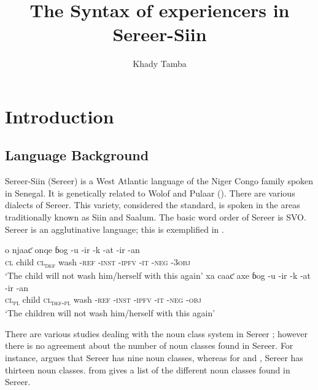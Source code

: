\documentclass[output=paper]{langscibook}
\author{Khady Tamba\affiliation{Université Cheikh Anta Diop}}
\title{The Syntax of experiencers in Sereer-Siin}
\begin{document}
 
\maketitle 

 

\section{Introduction}
\subsection{Language Background}

Sereer-Siin (Sereer) is a West Atlantic language of the Niger Congo family spoken in Senegal. It is genetically  related to Wolof  and Pulaar (\citealt{Simons2017}). There are various dialects of Sereer. This variety, considered the standard, is spoken in the areas traditionally known as Siin and Saalum.  The basic word order of Sereer is SVO. Sereer is an agglutinative language; this is exemplified in .

\ea \label{ex:tamba:1}
\ea
\gll o          njaaƈ   onqe                            ɓog     -u            -ir               {}-k    {}-at  {}-ir    {}-an\\            
    \textsc{cl}  child  \textsc{cl\textsubscript{def}} wash   -\textsc{ref}  -\textsc{inst}    {}-\textsc{ipfv} {}-\textsc{it}  {}-\textsc{neg}   {}-\textsc{3obj}\\
\glt `The child will not wash him/herself with this again'
\ex
\gll xa   caaƈ   axe   ɓog  {}-u  {}-ir       {}-k  {}-at    -ir      {}-an \\
\textsc{cl\textsubscript{pl}}  child  \textsc{cl\textsubscript{def-pl}} wash   -\textsc{ref}  -\textsc{inst}  {}-\textsc{ipfv}   -\textsc{it}    {}-\textsc{neg}   {}-\textsc{obj}\\
\glt `The children will not wash him/herself with this again'
\z
\z
    
There are various studies dealing with the noun class system in Sereer \citep{Fal1980, Faye1979, Faye2013, Renaudier2012};  however there is no agreement about the number of noun classes found in Sereer. For instance, \citet{Faye2013} argues that Sereer has nine noun classes, whereas for \citet{Fal1980} and \citet{McLaughlin1992}, Sereer has thirteen noun classes.  from \citet[284]{McLaughlin1992} gives a list of the different noun classes found in Sereer. 
\end{document}
